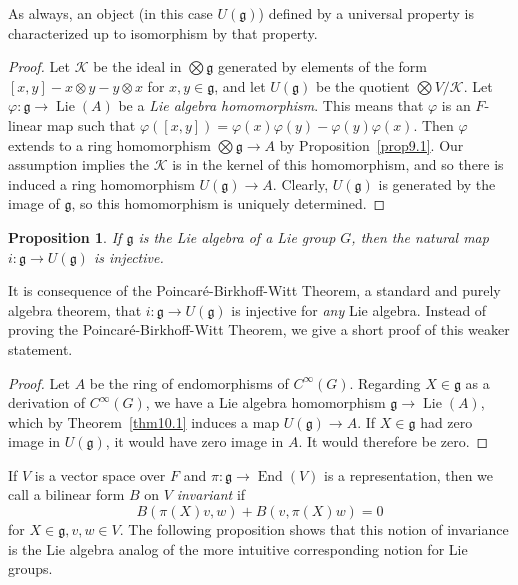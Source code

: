 \documentclass[12pt,reqno]{book}%
\newtheorem{proposition}{Proposition}[chapter]
\theoremstyle{definition}
\theoremstyle{remark}
\theoremstyle{theorem}
\theoremstyle{remark}
\DeclareMathOperator{\End}{End}
\DeclareMathOperator{\Lie}{Lie}
\begin{document}
As always, an object (in this case $U(\mathfrak{g})$) defined by a universal property is characterized up to isomorphism by that property.

\begin{proof}%
    Let $\mathcal{K}$ be the ideal in $\bigotimes \mathfrak{g}$ generated by elements of the form $[x, y] - x \otimes y - y \otimes x$ for $x, y \in \mathfrak{g}$, and let $U(\mathfrak{g})$ be the quotient $\bigotimes V/\mathcal{K}$.
    Let $\varphi : \mathfrak{g} \to \Lie(A)$ be a \emph{Lie algebra homomorphism}.
    This means that $\varphi$ is an $F$-linear map such that $\varphi([x, y]) = \varphi(x)\varphi(y) - \varphi(y)\varphi(x)$.
    Then $\varphi$ extends to a ring homomorphism $\bigotimes \mathfrak{g} \to A$ by Proposition~\ref{prop9.1}.
    Our assumption implies the $\mathcal{K}$ is in the kernel of this homomorphism, and so there is induced a ring homomorphism $U(\mathfrak{g}) \to A$.
    Clearly, $U(\mathfrak{g})$ is generated by the image of $\mathfrak{g}$, so this homomorphism is uniquely determined.
\end{proof}%

\begin{proposition}\label{prop10.1}%
    If $\mathfrak{g}$ is the Lie algebra of a Lie group $G$, then the natural map $i : \mathfrak{g} \to U(\mathfrak{g})$ is injective.
\end{proposition}%

It is consequence of the Poincar\'{e}-Birkhoff-Witt Theorem, a standard and purely algebra theorem, that $i : \mathfrak{g} \to U(\mathfrak{g})$ is injective for \emph{any} Lie algebra.
Instead of proving the Poincar\'{e}-Birkhoff-Witt Theorem, we give a short proof of this weaker statement.

\begin{proof}%
    Let $A$ be the ring of endomorphisms of $C^\infty(G)$.
    Regarding $X \in \mathfrak{g}$ as a derivation of $C^\infty(G)$, we have a Lie algebra homomorphism $\mathfrak{g} \to \Lie(A)$, which by Theorem~\ref{thm10.1} induces a map $U(\mathfrak{g}) \to A$.
    If $X \in \mathfrak{g}$ had zero image in $U(\mathfrak{g})$, it would have zero image in $A$.
    It would therefore be zero.
\end{proof}%

If $V$ is a vector space over $F$ and $\pi : \mathfrak{g} \to \End(V)$ is a representation, then we call a bilinear form $B$ on $V$ \emph{invariant} if
\[
    B(\pi(X)v , w) + B(v, \pi(X)w) = 0
\]
for $X \in \mathfrak{g}, v, w \in V$.
The following proposition shows that this notion of invariance is the Lie algebra analog of the more intuitive corresponding notion for Lie groups.
\end{document}
